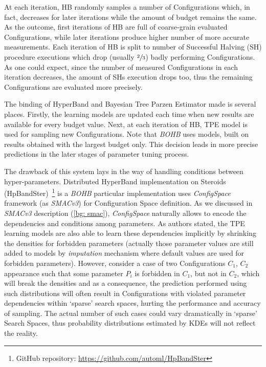 At each iteration, HB randomly samples a number of Configurations which, in fact, decreases for later iterations while the amount of budget remains the same. As the outcome, first iterations of HB are full of coarse-grain evaluated Configurations, while later iterations produce higher number of more accurate measurements. Each iteration of HB is split to number of Successful Halving (SH) procedure executions which drop (usually $\sfrac{2}{3}$) badly performing Configurations. As one could expect, since the number of measured Configurations in each iteration decreases, the amount of SHs execution drops too, thus the remaining Configurations are evaluated more precisely.

The binding of HyperBand and Bayesian Tree Parzen Estimator made is several places. Firstly, the learning models are updated each time when new results are available for every budget value. Next, at each iteration of HB, TPE model is used for sampling new Configurations. Note that \textit{BOHB} uses models, built on results obtained with the largest budget only. This decision leads in more precise predictions in the later stages of parameter tuning process.

The drawback of this system lays in the way of handling conditions between hyper-parameters. Distributed HyperBand implementation on Steroids (HpBandSter)~\footnote{GitHub repository: \url{https://github.com/automl/HpBandSter}} is a \textit{BOHB} particular implementation uses \textit{ConfigSpace} framework (as \textit{SMACv3}) for Configuration Space definition. As we discussed in \textit{SMACv3} description (\cref{bg: smac}), \textit{ConfigSpace} naturally allows to encode the dependencies and conditions among parameters. As authors stated, the TPE learning models are also able to learn these dependencies implicitly by shrinking the densities for forbidden parameters (actually those parameter values are still added to models by \textit{imputation} mechanism where default values are used for forbidden parameters). However, consider a case of two Configurations $C_1$, $C_2$ appearance such that some parameter $P_i$ is forbidden in $C_1$, but not in $C_2$, which will break the densities and as a consequence, the prediction performed using such distributions will often result in Configurations with violated parameter dependencies within `sparse' search spaces, hurting the performance and accuracy of sampling. The actual number of such cases could vary dramatically in `sparse' Search Spaces, thus probability distributions estimated by KDEs will not reflect the reality.


